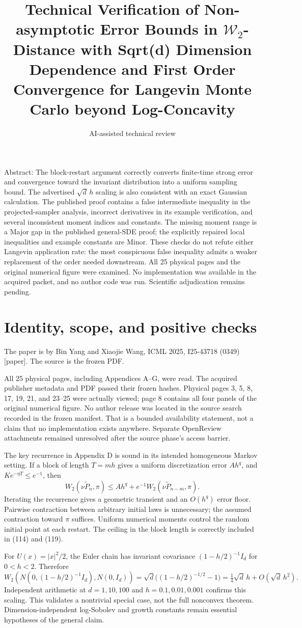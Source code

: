 \documentclass[10pt]{article}
\title{Technical Verification of Non-asymptotic Error Bounds in \(\mathcal W_2\)-Distance with Sqrt(d) Dimension Dependence and First Order Convergence for Langevin Monte Carlo beyond Log-Concavity}
\author{AI-assisted technical review}
\date{}
\begin{document}
\maketitle
Abstract: The block-restart argument correctly converts finite-time strong error and convergence toward the invariant distribution into a uniform sampling bound. The advertised \(\sqrt d\,h\) scaling is also consistent with an exact Gaussian calculation. The published proof contains a false intermediate inequality in the projected-sampler analysis, incorrect derivatives in its example verification, and several inconsistent moment indices and constants. The missing moment range is a Major gap in the published general-SDE proof; the explicitly repaired local inequalities and example constants are Minor. These checks do not refute either Langevin application rate: the most conspicuous false inequality admits a weaker replacement of the order needed downstream. All 25 physical pages and the original numerical figure were examined. No implementation was available in the acquired packet, and no author code was run. Scientific adjudication remains pending.\par
\section*{Identity, scope, and positive checks}
The paper is by Bin Yang and Xiaojie Wang, ICML 2025, I25-43718 (0349) [paper]. The source is the frozen PDF.\par
All 25 physical pages, including Appendices A–G, were read. The acquired publisher metadata and PDF passed their frozen hashes. Physical pages 3, 5, 8, 17, 19, 21, and 23–25 were actually viewed; page 8 contains all four panels of the original numerical figure. No author release was located in the source search recorded in the frozen manifest. That is a bounded availability statement, not a claim that no implementation exists anywhere. Separate OpenReview attachments remained unresolved after the source phase’s access barrier.\par
The key recurrence in Appendix D is sound in its intended homogeneous Markov setting. If a block of length \(T=mh\) gives a uniform discretization error \(A h^q\), and \(K e^{-\eta T}\le e^{-1}\), then \[W_2(\nu\widetilde P_n,\pi)\le A h^q+e^{-1}W_2(\nu\widetilde P_{n-m},\pi).\] Iterating the recurrence gives a geometric transient and an \(O(h^q)\) error floor. Pairwise contraction between arbitrary initial laws is unnecessary; the assumed contraction toward \(\pi\) suffices. Uniform numerical moments control the random initial point at each restart. The ceiling in the block length is correctly included in (114) and (119).\par
For \(U(x)=|x|^2/2\), the Euler chain has invariant covariance \((1-h/2)^{-1}I_d\) for \(0<h<2\). Therefore \[W_2\!\left(N(0,(1-h/2)^{-1}I_d),N(0,I_d)\right)
 =\sqrt d\bigl((1-h/2)^{-1/2}-1\bigr)
 =\tfrac14\sqrt d\,h+O(\sqrt d\,h^2).\] Independent arithmetic at \(d=1,10,100\) and \(h=0.1,0.01,0.001\) confirms this scaling. This validates a nontrivial special case, not the full nonconvex theorem. Dimension-independent log-Sobolev and growth constants remain essential hypotheses of the general claim.\par
\end{document}

